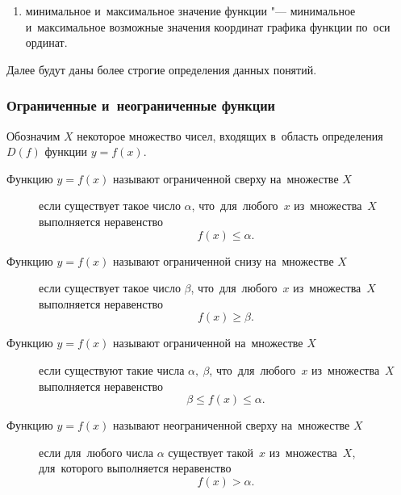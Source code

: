 \documentclass[]{scrartcl}
\begin{document}
\begin{enumerate}
	\item минимальное и~максимальное значение функции "--- минимальное и~максимальное возможные значения координат графика функции по~оси ординат.  
\end{enumerate}
Далее будут даны более строгие определения данных понятий.

\subsubsection{Ограниченные и~неограниченные функции}
Обозначим ${\textstyle X}$ некоторое множество чисел, входящих в~область определения  ${\textstyle D(f)}$ функции ${\textstyle y=f(x)}$.
\begin{description}
	\item[Функцию ${\textstyle y=f(x)}$ называют ограниченной сверху на~множестве ${\textstyle X}$] если существует такое число ${\textstyle \alpha}$, что~для~любого~${\textstyle x}$   из~множества~${\textstyle X}$ выполняется неравенство
	\begin{equation}\label{eq:function-1}
	f(x)\leq \alpha.
	\end{equation}
\end{description}
\begin{description}
	\item[Функцию ${\textstyle y=f(x)}$ называют ограниченной снизу на~множестве ${\textstyle X}$] если существует такое число ${\textstyle \beta}$, что~для~любого~${\textstyle x}$   из~множества~${\textstyle X}$ выполняется неравенство
	\begin{equation}\label{eq:function-2}
	f(x)\geq \beta.
	\end{equation}
\end{description}
\begin{description}
	\item[Функцию ${\textstyle y=f(x)}$ называют ограниченной на~множестве ${\textstyle X}$] если существуют такие числа ${\textstyle \alpha,\ \beta}$, что~для~любого~${\textstyle x}$  из~множества~${\textstyle X}$ выполняется неравенство
	\begin{equation}\label{eq:function-3}
	\beta \leq f(x)\leq \alpha.
	\end{equation}
\end{description}
\begin{description}
	\item[Функцию ${\textstyle y=f(x)}$ называют неограниченной сверху на~множестве ${\textstyle X}$] если для~любого числа ${\textstyle \alpha}$ существует такой~${\textstyle x}$  из~множества~${\textstyle X}$, для~которого выполняется неравенство
	\begin{equation}\label{eq:function-4}
	f(x) > \alpha.
	\end{equation}
\end{description}
\end{document}
